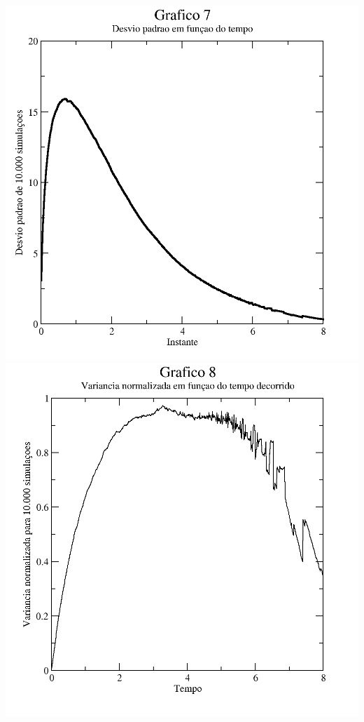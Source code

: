 \documentclass{article}
\begin{document}
\includegraphics[width=\textwidth]{graf7}
\includegraphics[width=\textwidth]{graf8}
\end{document}
